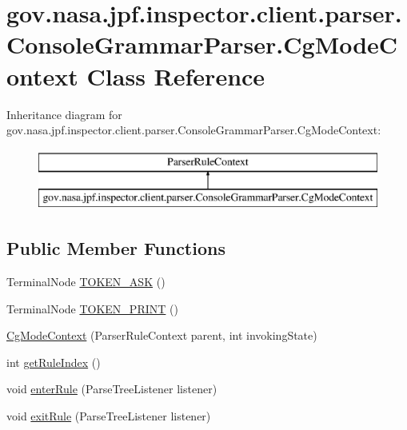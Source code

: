 \hypertarget{classgov_1_1nasa_1_1jpf_1_1inspector_1_1client_1_1parser_1_1_console_grammar_parser_1_1_cg_mode_context}{}\section{gov.\+nasa.\+jpf.\+inspector.\+client.\+parser.\+Console\+Grammar\+Parser.\+Cg\+Mode\+Context Class Reference}
\label{classgov_1_1nasa_1_1jpf_1_1inspector_1_1client_1_1parser_1_1_console_grammar_parser_1_1_cg_mode_context}
Inheritance diagram for gov.\+nasa.\+jpf.\+inspector.\+client.\+parser.\+Console\+Grammar\+Parser.\+Cg\+Mode\+Context\+:\begin{figure}[H]
\begin{center}
\leavevmode
\includegraphics[height=2.000000cm]{classgov_1_1nasa_1_1jpf_1_1inspector_1_1client_1_1parser_1_1_console_grammar_parser_1_1_cg_mode_context}
\end{center}
\end{figure}
\subsection*{Public Member Functions}
\begin{DoxyCompactItemize}
\item 
Terminal\+Node \hyperlink{classgov_1_1nasa_1_1jpf_1_1inspector_1_1client_1_1parser_1_1_console_grammar_parser_1_1_cg_mode_context_a104ffc5f393481a27dd965485261ad33}{T\+O\+K\+E\+N\+\_\+\+A\+SK} ()
\item 
Terminal\+Node \hyperlink{classgov_1_1nasa_1_1jpf_1_1inspector_1_1client_1_1parser_1_1_console_grammar_parser_1_1_cg_mode_context_a11d3973180ee0e8aa437df8b7bf9b8a4}{T\+O\+K\+E\+N\+\_\+\+P\+R\+I\+NT} ()
\item 
\hyperlink{classgov_1_1nasa_1_1jpf_1_1inspector_1_1client_1_1parser_1_1_console_grammar_parser_1_1_cg_mode_context_a97e5f093de7a0e6eeea4bc2d1bf08a76}{Cg\+Mode\+Context} (Parser\+Rule\+Context parent, int invoking\+State)
\item 
int \hyperlink{classgov_1_1nasa_1_1jpf_1_1inspector_1_1client_1_1parser_1_1_console_grammar_parser_1_1_cg_mode_context_abd86dcc72f5d0d41ff724456eaee619b}{get\+Rule\+Index} ()
\item 
void \hyperlink{classgov_1_1nasa_1_1jpf_1_1inspector_1_1client_1_1parser_1_1_console_grammar_parser_1_1_cg_mode_context_ae887ef8e34b3c0fefc57fb2c8eb5637a}{enter\+Rule} (Parse\+Tree\+Listener listener)
\item 
void \hyperlink{classgov_1_1nasa_1_1jpf_1_1inspector_1_1client_1_1parser_1_1_console_grammar_parser_1_1_cg_mode_context_a00235c68a5e6d7e834d1912c82ca263e}{exit\+Rule} (Parse\+Tree\+Listener listener)
\end{DoxyCompactItemize}

